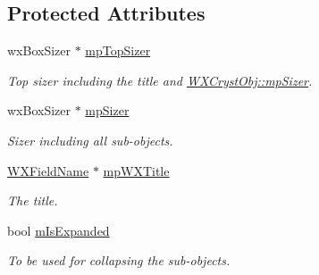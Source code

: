 \subsection*{Protected Attributes}
\begin{DoxyCompactItemize}
\item 
\mbox{\label{class_obj_cryst_1_1_w_x_cryst_obj_aaa27c0ed63bd119b55b884dc274c71bc}} 
wx\+Box\+Sizer $\ast$ \mbox{\hyperlink{class_obj_cryst_1_1_w_x_cryst_obj_aaa27c0ed63bd119b55b884dc274c71bc}{mp\+Top\+Sizer}}
\begin{DoxyCompactList}\small\item\em Top sizer including the title and \mbox{\hyperlink{class_obj_cryst_1_1_w_x_cryst_obj_a0fcc77bbdc5c4c3e191f96e15e82ef86}{W\+X\+Cryst\+Obj\+::mp\+Sizer}}. \end{DoxyCompactList}\item 
\mbox{\label{class_obj_cryst_1_1_w_x_cryst_obj_a0fcc77bbdc5c4c3e191f96e15e82ef86}} 
wx\+Box\+Sizer $\ast$ \mbox{\hyperlink{class_obj_cryst_1_1_w_x_cryst_obj_a0fcc77bbdc5c4c3e191f96e15e82ef86}{mp\+Sizer}}
\begin{DoxyCompactList}\small\item\em Sizer including all sub-\/objects. \end{DoxyCompactList}\item 
\mbox{\label{class_obj_cryst_1_1_w_x_cryst_obj_a047ca586b293087e62eaa2054ce6164e}} 
\mbox{\hyperlink{class_obj_cryst_1_1_w_x_field_name}{W\+X\+Field\+Name}} $\ast$ \mbox{\hyperlink{class_obj_cryst_1_1_w_x_cryst_obj_a047ca586b293087e62eaa2054ce6164e}{mp\+W\+X\+Title}}
\begin{DoxyCompactList}\small\item\em The title. \end{DoxyCompactList}\item 
\mbox{\label{class_obj_cryst_1_1_w_x_cryst_obj_a0ad5527d3992a9aa86b1f1475c213521}} 
bool \mbox{\hyperlink{class_obj_cryst_1_1_w_x_cryst_obj_a0ad5527d3992a9aa86b1f1475c213521}{m\+Is\+Expanded}}
\begin{DoxyCompactList}\small\item\em To be used for collapsing the sub-\/objects. \end{DoxyCompactList}\item 

\end{DoxyCompactItemize}
